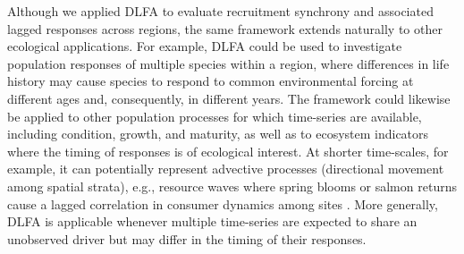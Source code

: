 \documentclass[12pt]{article}
\begin{document}
Although we applied DLFA to evaluate recruitment synchrony and
associated lagged responses across regions, the same framework extends
naturally to other ecological applications. For example, DLFA could be
used to investigate population responses of multiple species within a
region, where differences in life history may cause species to respond
to common environmental forcing at different ages and, consequently, in
different years. The framework could likewise be applied to other
population processes for which time-series are available, including
condition, growth, and maturity, as well as to ecosystem indicators
where the timing of responses is of ecological interest. At shorter
time-scales, for example, it can potentially represent advective
processes (directional movement among spatial strata), e.g., resource
waves where spring blooms or salmon returns cause a lagged correlation
in consumer dynamics among sites \citep{armstrong_resource_2016}. More
generally, DLFA is applicable whenever multiple time-series are expected
to share an unobserved driver but may differ in the timing of their
responses.
\end{document}
